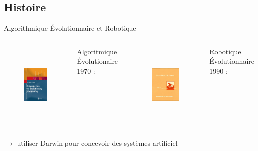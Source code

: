 \documentclass[8pt]{beamer}
\begin{document}
\subsection{Histoire}
\begin{frame}{Algorithmique \'Evolutionnaire et Robotique}

	\vfill
	\begin{columns}
		\begin{figure}[h]
			\begin{center}
				\includegraphics[height=4cm]{images/ec}
			\end{center}
			\caption{\cite{eiben03introductiontoevolutionarycomputing}}
			\label{fig:ec}
		\end{figure} 

		\vfill
		Algoritmique Évolutionaire 1970 : \cite{holland75adaptationnaturalartificialsystem}



		\begin{figure}[h]
			\begin{center}
				\includegraphics[height=4cm]{images/er}
			\end{center}
			\caption{\cite{nolfi00evolrobobiolintetechselfmach}}
			\label{fig:er}
		\end{figure}

		\vfill
		Robotique Évolutionnaire 1990 : \cite{nolfi00evolrobobiolintetechselfmach}
	\end{columns}
	\vfill

	$\rightarrow$ utiliser Darwin pour concevoir des systèmes artificiel
\end{frame}
\end{document}
